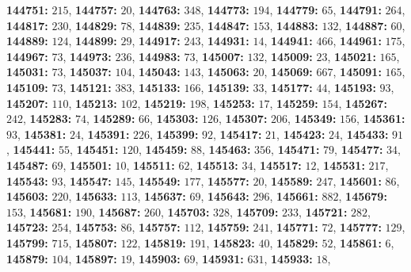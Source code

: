 \textsf{\bfseries 144751:} $215$, \textsf{\bfseries 144757:} $20$, \textsf{\bfseries 144763:} $348$, \textsf{\bfseries 144773:} $194$, \textsf{\bfseries 144779:} $65$, \textsf{\bfseries 144791:} $264$, \textsf{\bfseries 144817:} $230$, \textsf{\bfseries 144829:} $78$, \textsf{\bfseries 144839:} $235$, \textsf{\bfseries 144847:} $153$, \textsf{\bfseries 144883:} $132$, \textsf{\bfseries 144887:} $60$, \textsf{\bfseries 144889:} $124$, \textsf{\bfseries 144899:} $29$, \textsf{\bfseries 144917:} $243$, \textsf{\bfseries 144931:} $14$, \textsf{\bfseries 144941:} $466$, \textsf{\bfseries 144961:} $175$, \textsf{\bfseries 144967:} $73$, \textsf{\bfseries 144973:} $236$, \textsf{\bfseries 144983:} $73$, \textsf{\bfseries 145007:} $132$, \textsf{\bfseries 145009:} $23$, \textsf{\bfseries 145021:} $165$, \textsf{\bfseries 145031:} $73$, \textsf{\bfseries 145037:} $104$, \textsf{\bfseries 145043:} $143$, \textsf{\bfseries 145063:} $20$, \textsf{\bfseries 145069:} $667$, \textsf{\bfseries 145091:} $165$, \textsf{\bfseries 145109:} $73$, \textsf{\bfseries 145121:} $383$, \textsf{\bfseries 145133:} $166$, \textsf{\bfseries 145139:} $33$, \textsf{\bfseries 145177:} $44$, \textsf{\bfseries 145193:} $93$, \textsf{\bfseries 145207:} $110$, \textsf{\bfseries 145213:} $102$, \textsf{\bfseries 145219:} $198$, \textsf{\bfseries 145253:} $17$, \textsf{\bfseries 145259:} $154$, \textsf{\bfseries 145267:} $242$, \textsf{\bfseries 145283:} $74$, \textsf{\bfseries 145289:} $66$, \textsf{\bfseries 145303:} $126$, \textsf{\bfseries 145307:} $206$, \textsf{\bfseries 145349:} $156$, \textsf{\bfseries 145361:} $93$, \textsf{\bfseries 145381:} $24$, \textsf{\bfseries 145391:} $226$, \textsf{\bfseries 145399:} $92$, \textsf{\bfseries 145417:} $21$, \textsf{\bfseries 145423:} $24$, \textsf{\bfseries 145433:} $91$, \textsf{\bfseries 145441:} $55$, \textsf{\bfseries 145451:} $120$, \textsf{\bfseries 145459:} $88$, \textsf{\bfseries 145463:} $356$, \textsf{\bfseries 145471:} $79$, \textsf{\bfseries 145477:} $34$, \textsf{\bfseries 145487:} $69$, \textsf{\bfseries 145501:} $10$, \textsf{\bfseries 145511:} $62$, \textsf{\bfseries 145513:} $34$, \textsf{\bfseries 145517:} $12$, \textsf{\bfseries 145531:} $217$, \textsf{\bfseries 145543:} $93$, \textsf{\bfseries 145547:} $145$, \textsf{\bfseries 145549:} $177$, \textsf{\bfseries 145577:} $20$, \textsf{\bfseries 145589:} $247$, \textsf{\bfseries 145601:} $86$, \textsf{\bfseries 145603:} $220$, \textsf{\bfseries 145633:} $113$, \textsf{\bfseries 145637:} $69$, \textsf{\bfseries 145643:} $296$, \textsf{\bfseries 145661:} $882$, \textsf{\bfseries 145679:} $153$, \textsf{\bfseries 145681:} $190$, \textsf{\bfseries 145687:} $260$, \textsf{\bfseries 145703:} $328$, \textsf{\bfseries 145709:} $233$, \textsf{\bfseries 145721:} $282$, \textsf{\bfseries 145723:} $254$, \textsf{\bfseries 145753:} $86$, \textsf{\bfseries 145757:} $112$, \textsf{\bfseries 145759:} $241$, \textsf{\bfseries 145771:} $72$, \textsf{\bfseries 145777:} $129$, \textsf{\bfseries 145799:} $715$, \textsf{\bfseries 145807:} $122$, \textsf{\bfseries 145819:} $191$, \textsf{\bfseries 145823:} $40$, \textsf{\bfseries 145829:} $52$, \textsf{\bfseries 145861:} $6$, \textsf{\bfseries 145879:} $104$, \textsf{\bfseries 145897:} $19$, \textsf{\bfseries 145903:} $69$, \textsf{\bfseries 145931:} $631$, \textsf{\bfseries 145933:} $18$, 
